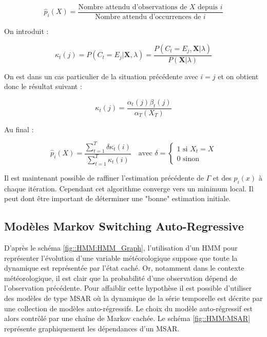\documentclass[12pt]{report}
\begin{document}
\begin{equation}
\hat{p}_i(X) = \frac{\text{Nombre attendu d'observations de }X\text{ depuis }i}
{\text{Nombre attendu d'occurrences  de }i}
\end{equation}

On introduit :

\begin{equation}
\kappa_t(j) = P(C_t=E_j|\bm{X},\lambda) = \frac{P(C_t=E_j,\bm{X}|\lambda)}{P(\bm{X}|\lambda)}
\end{equation} 

On est dans un cas particulier de la situation précédente avec $i=j$ et on obtient donc le résultat suivant :

\begin{equation}
\kappa_t(j) = \frac{\alpha_t(j)\beta_t(j)}{\alpha_T(X_T)}
\end{equation}

Au final :

\begin{equation}
\hat{p}_i(X) = \frac
{\sum\limits_{t=1}^T  \delta \kappa_t(i)}
{\sum\limits_{t=1}^T  \kappa_t(i)}
\quad \text{avec } \delta=
\begin{cases}
1\text{ si }X_t=X \\
0\text{ sinon}
\end{cases}
\end{equation}

Il est maintenant possible de raffiner l'estimation précédente de $\Gamma$ et des $p_i(x)$ à chaque itération. Cependant cet algorithme converge vers un minimum local. Il peut dont être important de déterminer une "bonne" estimation initiale.

\subsection{Modèles Markov Switching Auto-Regressive}
\label{subsec:Modeles_MSAR}
D'après le schéma \ref{fig::HMM:HMM_Graph}, l'utilisation d'un HMM pour représenter l'évolution d'une variable météorologique suppose que toute la dynamique est représentée par l'état caché. Or, notamment dans le contexte météorologique, il est clair que la probabilité d'une observation dépend de l'observation précédente. Pour affaiblir cette hypothèse il est possible d'utiliser des modèles de type MSAR où la dynamique de la série temporelle est décrite par une collection de modèles auto-régressifs. Le choix du modèle auto-régressif est alors contrôlé par une chaîne de Markov cachée. Le schéma \ref{fig::HMM:MSAR} représente graphiquement les dépendances d'un MSAR.
\end{document}
